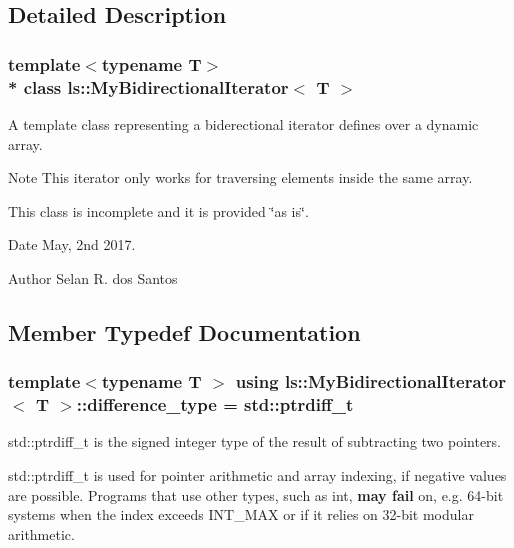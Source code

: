 \subsection{Detailed Description}
\subsubsection*{template$<$typename T$>$\\*
class ls\+::\+My\+Bidirectional\+Iterator$<$ T $>$}

A template class representing a biderectional iterator defines over a dynamic array.

\begin{DoxyNote}{Note}
This iterator only works for traversing elements inside the same array.
\end{DoxyNote}
This class is incomplete and it is provided \char`\"{}as is\char`\"{}.

\begin{DoxyDate}{Date}
May, 2nd 2017. 
\end{DoxyDate}
\begin{DoxyAuthor}{Author}
Selan R. dos Santos 
\end{DoxyAuthor}


\subsection{Member Typedef Documentation}
\subsubsection[{\texorpdfstring{difference\+\_\+type}{difference_type}}]{\setlength{\rightskip}{0pt plus 5cm}template$<$typename T $>$ using {\bf ls\+::\+My\+Bidirectional\+Iterator}$<$ T $>$\+::{\bf difference\+\_\+type} =  std\+::ptrdiff\+\_\+t}\hypertarget{classls_1_1MyBidirectionalIterator_a4f1b64a39dc7c11d9259354d1a5753ee}{}\label{classls_1_1MyBidirectionalIterator_a4f1b64a39dc7c11d9259354d1a5753ee}


std\+::ptrdiff\+\_\+t is the signed integer type of the result of subtracting two pointers. 

std\+::ptrdiff\+\_\+t is used for pointer arithmetic and array indexing, if negative values are possible. Programs that use other types, such as int, {\bfseries may fail} on, e.\+g. 64-\/bit systems when the index exceeds I\+N\+T\+\_\+\+M\+AX or if it relies on 32-\/bit modular arithmetic.

